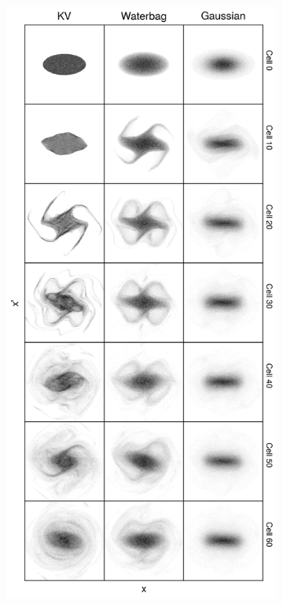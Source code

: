 \begin{figure}[!p]
\begin{subfigure}[b]{0.45\textwidth}
        \label{fig:coherent_instabilities_a}
    \end{subfigure}
    \hfill
    \begin{subfigure}[b]{0.45\textwidth}
        \includegraphics[width=\textwidth]{Images/chapter1/coherent_instability_third_order.png}

\end{subfigure}
\end{figure}
